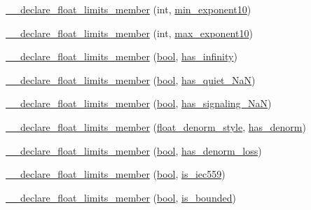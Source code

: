 \begin{DoxyCompactItemize}
\item 
\hyperlink{limits-hack_8h_a22293d115fc3ee5edc5bcd560969f1bb}{\+\_\+\+\_\+declare\+\_\+float\+\_\+limits\+\_\+member} (int, \hyperlink{numinquire_8h_a19a31114f3d5002b21f2f27f64f9cd10}{min\+\_\+exponent10})
\item 
\hyperlink{limits-hack_8h_aaa76998d36f312c47482fc004e226344}{\+\_\+\+\_\+declare\+\_\+float\+\_\+limits\+\_\+member} (int, \hyperlink{numinquire_8h_a901d50aee85856e45aa6c873dfdca1ec}{max\+\_\+exponent10})
\item 
\hyperlink{limits-hack_8h_ac1c7eecc4d08dc9041bc588ffe465e1d}{\+\_\+\+\_\+declare\+\_\+float\+\_\+limits\+\_\+member} (\hyperlink{compiler_8h_abb452686968e48b67397da5f97445f5b}{bool}, \hyperlink{numinquire_8h_aee9e37bc852a79d447e9b4b5ede2b9f1}{has\+\_\+infinity})
\item 
\hyperlink{limits-hack_8h_aad1e5e7715aef9eeaae13f5c0cc8dfe6}{\+\_\+\+\_\+declare\+\_\+float\+\_\+limits\+\_\+member} (\hyperlink{compiler_8h_abb452686968e48b67397da5f97445f5b}{bool}, \hyperlink{numinquire_8h_a4cb0567bdb12a6477256aff5a3af1430}{has\+\_\+quiet\+\_\+\+Na\+N})
\item 
\hyperlink{limits-hack_8h_ac58a1601a5a0a28889de478de1921bcc}{\+\_\+\+\_\+declare\+\_\+float\+\_\+limits\+\_\+member} (\hyperlink{compiler_8h_abb452686968e48b67397da5f97445f5b}{bool}, \hyperlink{numinquire_8h_aceee39c084782fed018c4b6ba7ba75ca}{has\+\_\+signaling\+\_\+\+Na\+N})
\item 
\hyperlink{limits-hack_8h_a739b797b818ae861b0e09c7e1e5b3cb8}{\+\_\+\+\_\+declare\+\_\+float\+\_\+limits\+\_\+member} (\hyperlink{limits-hack_8h_a592fe78d9bf66455d12aa075f36313b6}{float\+\_\+denorm\+\_\+style}, \hyperlink{numinquire_8h_aeb5ecb4e92ce1ffdf2af4793cb48cf13}{has\+\_\+denorm})
\item 
\hyperlink{limits-hack_8h_a3fcf77a5571b0286e292520174cc97c7}{\+\_\+\+\_\+declare\+\_\+float\+\_\+limits\+\_\+member} (\hyperlink{compiler_8h_abb452686968e48b67397da5f97445f5b}{bool}, \hyperlink{numinquire_8h_a623bde00cdaac6a34529424b0e8f69af}{has\+\_\+denorm\+\_\+loss})
\item 
\hyperlink{limits-hack_8h_a863f6666319d2a3e9368f94996314bb8}{\+\_\+\+\_\+declare\+\_\+float\+\_\+limits\+\_\+member} (\hyperlink{compiler_8h_abb452686968e48b67397da5f97445f5b}{bool}, \hyperlink{numinquire_8h_ac68b7a83df5f772e268dca6b69101d2c}{is\+\_\+iec559})
\item 
\hyperlink{limits-hack_8h_abab9e91e9d8c63389f964a00a58bfac3}{\+\_\+\+\_\+declare\+\_\+float\+\_\+limits\+\_\+member} (\hyperlink{compiler_8h_abb452686968e48b67397da5f97445f5b}{bool}, \hyperlink{numinquire_8h_a76c822eea59ab5dacbd0bc2d94d94928}{is\+\_\+bounded})

\end{DoxyCompactItemize}
